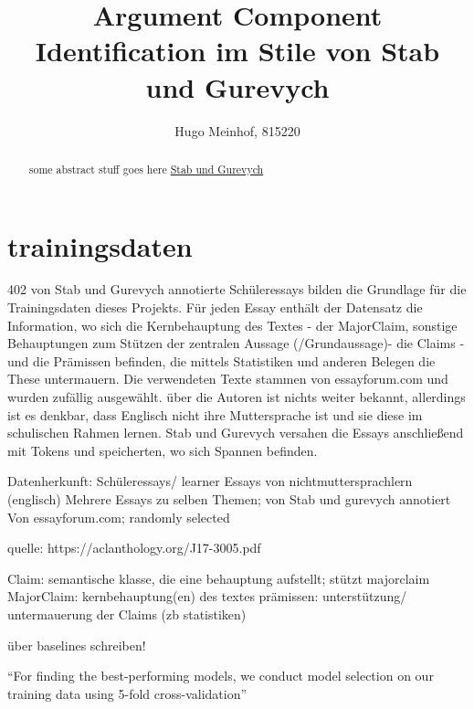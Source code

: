 \documentclass[12]{article}
\title{Argument Component Identification im Stile von Stab und Gurevych}
\author{Hugo Meinhof, 815220}
\theoremstyle{mytheoremstyle}
\theoremstyle{mytheoremstyle}
\theoremstyle{myproblemstyle}
\begin{document}
  \maketitle
  \begin{abstract}
  some abstract stuff goes here \href{https://aclanthology.org/J17-3005/}{Stab und Gurevych}
  \end{abstract}
  \section{trainingsdaten\dotfill}
  402 von Stab und Gurevych annotierte Schüleressays bilden die Grundlage für die Trainingsdaten dieses Projekts. Für jeden Essay enthält der Datensatz die Information, wo sich die Kernbehauptung des Textes - der MajorClaim, sonstige Behauptungen zum Stützen der zentralen Aussage (/Grundaussage)- die Claims - und die Prämissen befinden, die mittels Statistiken und anderen Belegen die These untermauern. 
  Die verwendeten Texte stammen von essayforum.com und wurden zufällig ausgewählt. über die Autoren ist nichts weiter bekannt, allerdings ist es denkbar, dass Englisch nicht ihre Muttersprache ist und sie diese im schulischen Rahmen lernen.
  Stab und Gurevych versahen die Essays anschließend mit Tokens und speicherten, wo sich Spannen befinden. 


  Datenherkunft: Schüleressays/ learner Essays von nichtmuttersprachlern (englisch)
  Mehrere Essays zu selben Themen; von Stab und gurevych annotiert
  Von essayforum.com; randomly selected 

  quelle: https://aclanthology.org/J17-3005.pdf

  Claim: semantische klasse, die eine behauptung aufstellt; stützt majorclaim 
  MajorClaim: kernbehauptung(en) des textes 
  prämissen: unterstützung/ untermauerung der Claims (zb statistiken) 

  über baselines schreiben!

  ``For finding the best-performing models, we conduct model selection on our training data using 5-fold cross-validation''
\end{document}
